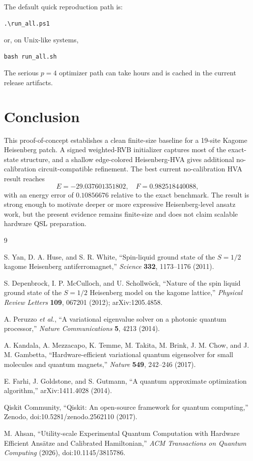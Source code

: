 \documentclass[11pt]{article}
\newcommand{\hvaE}{-29.037601351802}
\newcommand{\hvaF}{0.982518440088}
\begin{document}
The default quick reproduction path is:
\begin{verbatim}
.\run_all.ps1
\end{verbatim}
or, on Unix-like systems,
\begin{verbatim}
bash run_all.sh
\end{verbatim}
The serious $p=4$ optimizer path can take hours and is cached in the current release artifacts.

\section{Conclusion}

This proof-of-concept establishes a clean finite-size baseline for a 19-site Kagome Heisenberg patch.  A signed weighted-RVB initializer captures most of the exact-state structure, and a shallow edge-colored Heisenberg-HVA gives additional no-calibration circuit-compatible refinement.  The best current no-calibration HVA result reaches
\[
E=\hvaE,\quad F=\hvaF,
\]
with an energy error of $0.10856676$ relative to the exact benchmark.  The result is strong enough to motivate deeper or more expressive Heisenberg-level ansatz work, but the present evidence remains finite-size and does not claim scalable hardware QSL preparation.

\begin{thebibliography}{9}
\raggedright

S. Yan, D. A. Huse, and S. R. White,
``Spin-liquid ground state of the $S=1/2$ kagome Heisenberg antiferromagnet,''
\emph{Science} \textbf{332}, 1173--1176 (2011).

S. Depenbrock, I. P. McCulloch, and U. Schollw\"ock,
``Nature of the spin liquid ground state of the $S=1/2$ Heisenberg model on the kagome lattice,''
\emph{Physical Review Letters} \textbf{109}, 067201 (2012);
arXiv:1205.4858.

A. Peruzzo \emph{et al.},
``A variational eigenvalue solver on a photonic quantum processor,''
\emph{Nature Communications} \textbf{5}, 4213 (2014).

A. Kandala, A. Mezzacapo, K. Temme, M. Takita, M. Brink, J. M. Chow, and J. M. Gambetta,
``Hardware-efficient variational quantum eigensolver for small molecules and quantum magnets,''
\emph{Nature} \textbf{549}, 242--246 (2017).

E. Farhi, J. Goldstone, and S. Gutmann,
``A quantum approximate optimization algorithm,''
arXiv:1411.4028 (2014).

Qiskit Community,
``Qiskit: An open-source framework for quantum computing,''
Zenodo, doi:10.5281/zenodo.2562110 (2017).

M. Ahsan,
``Utility-scale Experimental Quantum Computation with Hardware Efficient Ans\"{a}tze and Calibrated Hamiltonian,''
\emph{ACM Transactions on Quantum Computing} (2026), doi:10.1145/3815786.

\end{thebibliography}
\end{document}
